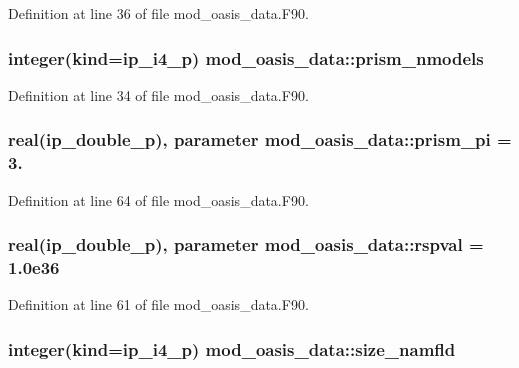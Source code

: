 Definition at line 36 of file mod\+\_\+oasis\+\_\+data.\+F90.

\hypertarget{classmod__oasis__data_a5915b02f461626d5a6cffbf037daa75e}{
\subsubsection[{prism\+\_\+nmodels}]{\setlength{\rightskip}{0pt plus 5cm}integer(kind=ip\+\_\+i4\+\_\+p) mod\+\_\+oasis\+\_\+data\+::prism\+\_\+nmodels}}\label{classmod__oasis__data_a5915b02f461626d5a6cffbf037daa75e}


Definition at line 34 of file mod\+\_\+oasis\+\_\+data.\+F90.

\hypertarget{classmod__oasis__data_ad5c84ea4b3063c2a3883b6d6571afeb0}{
\subsubsection[{prism\+\_\+pi}]{\setlength{\rightskip}{0pt plus 5cm}real(ip\+\_\+double\+\_\+p), parameter mod\+\_\+oasis\+\_\+data\+::prism\+\_\+pi = 3.}}\label{classmod__oasis__data_ad5c84ea4b3063c2a3883b6d6571afeb0}


Definition at line 64 of file mod\+\_\+oasis\+\_\+data.\+F90.

\hypertarget{classmod__oasis__data_a3fea2837639caadabd693f405693edbb}{
\subsubsection[{rspval}]{\setlength{\rightskip}{0pt plus 5cm}real(ip\+\_\+double\+\_\+p), parameter mod\+\_\+oasis\+\_\+data\+::rspval = 1.\+0e36}}\label{classmod__oasis__data_a3fea2837639caadabd693f405693edbb}


Definition at line 61 of file mod\+\_\+oasis\+\_\+data.\+F90.

\hypertarget{classmod__oasis__data_aa8588b3be582de7f61aa318d45854483}{
\subsubsection[{size\+\_\+namfld}]{\setlength{\rightskip}{0pt plus 5cm}integer(kind=ip\+\_\+i4\+\_\+p) mod\+\_\+oasis\+\_\+data\+::size\+\_\+namfld}}\label{classmod__oasis__data_aa8588b3be582de7f61aa318d45854483}


